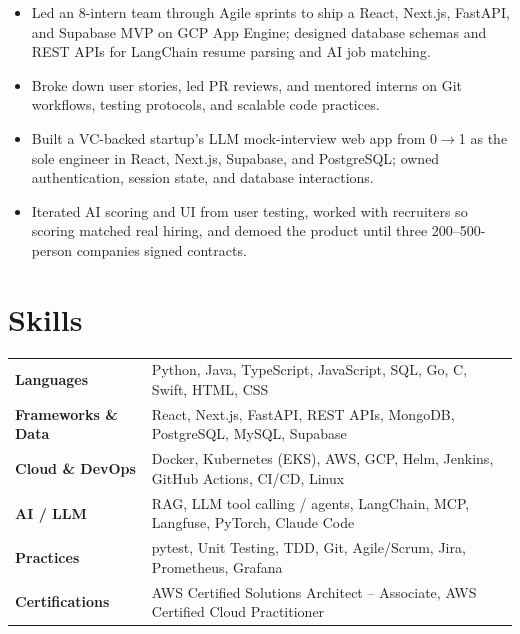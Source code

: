 \documentclass[11pt, letterpaper]{article}
\begin{document}
\vspace{1pt}
\begin{itemize}
  \item Led an 8-intern team through Agile sprints to ship a React, Next.js, FastAPI, and Supabase MVP on GCP App Engine; designed database schemas and REST APIs for LangChain resume parsing and AI job matching.
  \item Broke down user stories, led PR reviews, and mentored interns on Git workflows, testing protocols, and scalable code practices.
\end{itemize}

\vspace{1pt}
\begin{itemize}
  \item Built a VC-backed startup's LLM mock-interview web app from 0$\to$1 as the sole engineer in React, Next.js, Supabase, and PostgreSQL; owned authentication, session state, and database interactions.
  \item Iterated AI scoring and UI from user testing, worked with recruiters so scoring matched real hiring, and demoed the product until three 200--500-person companies signed contracts.
\end{itemize}

\section{Skills}
\begin{tabularx}{\textwidth}{@{}l @{\hspace{7pt}} >{\raggedright\arraybackslash}X@{}}
  \textbf{Languages} & Python, Java, TypeScript, JavaScript, SQL, Go, C, Swift, HTML, CSS \\[1pt]
  \textbf{Frameworks \& Data} & React, Next.js, FastAPI, REST APIs, MongoDB, PostgreSQL, MySQL, Supabase \\[1pt]
  \textbf{Cloud \& DevOps} & Docker, Kubernetes (EKS), AWS, GCP, Helm, Jenkins, GitHub Actions, CI/CD, Linux \\[1pt]
  \textbf{AI / LLM} & RAG, LLM tool calling / agents, LangChain, MCP, Langfuse, PyTorch, Claude Code \\[1pt]
  \textbf{Practices} & pytest, Unit Testing, TDD, Git, Agile/Scrum, Jira, Prometheus, Grafana \\[1pt]
  \textbf{Certifications} & AWS Certified Solutions Architect -- Associate, AWS Certified Cloud Practitioner \\
\end{tabularx}
\end{document}
